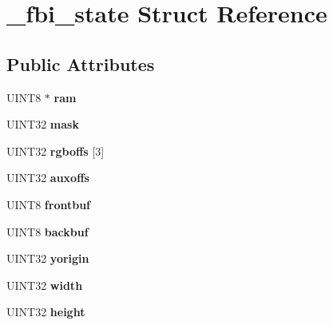 \hypertarget{struct__fbi__state}{\section{\-\_\-fbi\-\_\-state Struct Reference}
\label{struct__fbi__state}
}
\subsection*{Public Attributes}
\begin{DoxyCompactItemize}
\item 
\hypertarget{struct__fbi__state_a1dc3b6dd14b4c1cbb6fa16437e0a6b6f}{U\-I\-N\-T8 $\ast$ {\bfseries ram}}\label{struct__fbi__state_a1dc3b6dd14b4c1cbb6fa16437e0a6b6f}

\item 
\hypertarget{struct__fbi__state_af0ffbdd689abb95932a5d6994f532129}{U\-I\-N\-T32 {\bfseries mask}}\label{struct__fbi__state_af0ffbdd689abb95932a5d6994f532129}

\item 
\hypertarget{struct__fbi__state_a57b0b74dae3ca14a34cb9fb583e3d022}{U\-I\-N\-T32 {\bfseries rgboffs} \mbox{[}3\mbox{]}}\label{struct__fbi__state_a57b0b74dae3ca14a34cb9fb583e3d022}

\item 
\hypertarget{struct__fbi__state_ad2662e23e3e4ee2ca9e3d14f6fcf82f4}{U\-I\-N\-T32 {\bfseries auxoffs}}\label{struct__fbi__state_ad2662e23e3e4ee2ca9e3d14f6fcf82f4}

\item 
\hypertarget{struct__fbi__state_a62838c94817fda2ded8c68c84e956966}{U\-I\-N\-T8 {\bfseries frontbuf}}\label{struct__fbi__state_a62838c94817fda2ded8c68c84e956966}

\item 
\hypertarget{struct__fbi__state_abacda58490db51500ac379629ec393cb}{U\-I\-N\-T8 {\bfseries backbuf}}\label{struct__fbi__state_abacda58490db51500ac379629ec393cb}

\item 
\hypertarget{struct__fbi__state_af2945254aa88f79af8ee5f58ac5b182f}{U\-I\-N\-T32 {\bfseries yorigin}}\label{struct__fbi__state_af2945254aa88f79af8ee5f58ac5b182f}

\item 
\hypertarget{struct__fbi__state_a082ff1aba7bdbedd010d488e7b49ae39}{U\-I\-N\-T32 {\bfseries width}}\label{struct__fbi__state_a082ff1aba7bdbedd010d488e7b49ae39}

\item 
\hypertarget{struct__fbi__state_ad8eabe976324b9df8e05eb64da68fd46}{U\-I\-N\-T32 {\bfseries height}}\label{struct__fbi__state_ad8eabe976324b9df8e05eb64da68fd46}


\end{DoxyCompactItemize}
